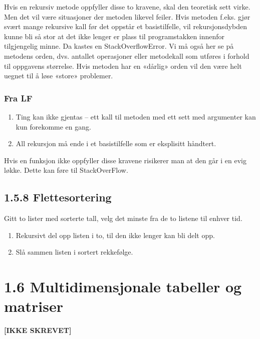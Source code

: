 \documentclass[11pt]{article}
\begin{document}
        Hvis en rekursiv metode oppfyller disse to kravene, skal den teoretisk sett virke. Men det vil
        være situasjoner der metoden likevel feiler. Hvis metoden f.eks. gjør svært mange rekursive
        kall før det oppstår et basistilfelle, vil rekursjonsdybden kunne bli så stor at det ikke lenger er
        plass til programstakken innenfor tilgjengelig minne. Da kastes en StackOverflowError. Vi
        må også her se på metodens orden, dvs. antallet operasjoner eller metodekall som utføres i
        forhold til oppgavens størrelse. Hvis metoden har en «dårlig» orden vil den være helt uegnet
        til å løse «store» problemer.


        \subsubsection{Fra LF} 
            \begin{enumerate}
                \item Ting kan ikke gjentas – ett kall til metoden med ett sett med argumenter kan kun
                forekomme en gang.
                \item All rekursjon må ende i et basistilfelle som er eksplisitt
                håndtert.
            \end{enumerate}

            Hvis en funksjon ikke oppfyller disse kravene risikerer man at den går i en evig løkke.
            Dette kan føre til StackOverFlow.

    \subsection{1.5.8 Flettesortering}
        Gitt to lister med sorterte tall,
        velg det minste fra de to listene til enhver tid. \\

        \begin{enumerate}
            \item Rekursivt del opp listen i to, til den ikke lenger kan bli delt opp.
            \item Slå sammen listen i sortert rekkefølge.
        \end{enumerate}


\section{1.6 Multidimensjonale tabeller og matriser}
    \textbf{[IKKE SKREVET]}
\end{document}
